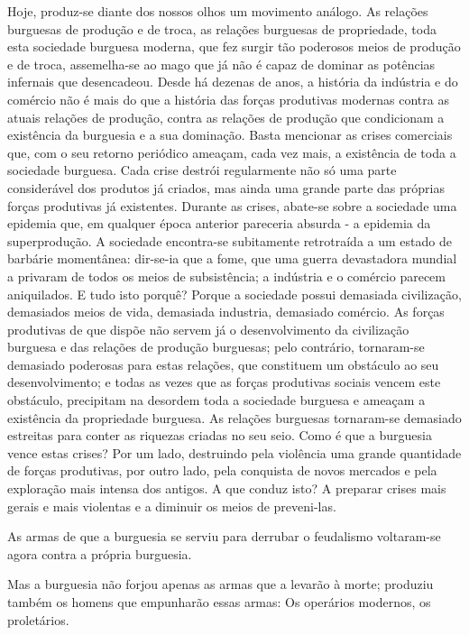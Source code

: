 Hoje, produz-se diante dos nossos olhos um movimento análogo. As
relações burguesas de produção e de troca, as relações burguesas de
propriedade, toda esta sociedade burguesa moderna, que fez surgir tão
poderosos meios de produção e de troca, assemelha-se ao mago que já
não é capaz de dominar as potências infernais que desencadeou. Desde
há dezenas de anos, a história da indústria e do comércio não é mais
do que a história das forças produtivas modernas contra as atuais
relações de produção, contra as relações de produção que condicionam a
existência da burguesia e a sua dominação. Basta mencionar as crises
comerciais que, com o seu retorno periódico ameaçam, cada vez mais, a
existência de toda a sociedade burguesa. Cada crise destrói
regularmente não só uma parte considerável dos produtos já criados,
mas ainda uma grande parte das próprias forças produtivas já
existentes. Durante as crises, abate-se sobre a sociedade uma epidemia
que, em qualquer época anterior pareceria absurda - a epidemia da
superprodução. A sociedade encontra-se subitamente retrotraída a um
estado de barbárie momentânea: dir-se-ia que a fome, que uma guerra
devastadora mundial a privaram de todos os meios de subsistência; a
indústria e o comércio parecem aniquilados. E tudo isto porquê? Porque
a sociedade possui demasiada civilização, demasiados meios de vida,
demasiada industria, demasiado comércio. As forças produtivas de que
dispõe não servem já o desenvolvimento da civilização burguesa e das
relações de produção burguesas; pelo contrário, tornaram-se demasiado
poderosas para estas relações, que constituem um obstáculo ao seu
desenvolvimento; e todas as vezes que as forças produtivas sociais
vencem este obstáculo, precipitam na desordem toda a sociedade
burguesa e ameaçam a existência da propriedade burguesa. As relações
burguesas tornaram-se demasiado estreitas para conter as riquezas
criadas no seu seio. Como é que a burguesia vence estas crises? Por um
lado, destruindo pela violência uma grande quantidade de forças
produtivas, por outro lado, pela conquista de novos mercados e pela
exploração mais intensa dos antigos. A que conduz isto? A preparar
crises mais gerais e mais violentas e a diminuir os meios de
preveni-las.

As armas de que a burguesia se serviu para derrubar o feudalismo
voltaram-se agora contra a própria burguesia.

Mas a burguesia não forjou apenas as armas que a levarão à morte;
produziu também os homens que empunharão essas armas: Os operários
modernos, os proletários.

